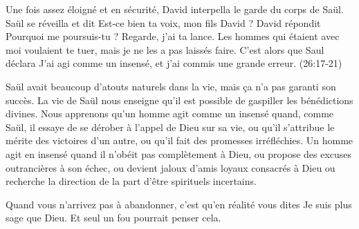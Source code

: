 Une fois assez éloigné et en sécurité, David interpella
 le garde du corps de Saül.
 Saül se réveilla et dit\frcolon
 \Og Est-ce bien ta voix, mon fils David ? \Fg{}
 David répondit\frcolon
 \Og Pourquoi me poursuis-tu ? Regarde, j'ai ta lance.
 Les hommes qui étaient avec moi voulaient te tuer,
 mais je ne les a pas laissés faire. \Fg{}
 C'est alors que Saul déclara\frcolon
 \Og J'ai agi comme un insensé, et j'ai commis une grande erreur. \Fg{}
 (26:17-21)

Saül avait beaucoup d'atouts naturels dans la vie,
 mais \c{c}a n'a pas garanti son succès.
 La vie de Saül nous enseigne qu'il est possible
 de gaspiller les bénédictions divines.
 Nous apprenons qu'un homme agit comme un insensé quand,
 comme Saül, il essaye de se dérober à l'appel de Dieu sur sa vie,
 ou qu'il s'attribue le mérite des victoires d'un autre,
 ou qu'il fait des promesses irréfléchies.
 Un homme agit en insensé quand il n'obéit pas complètement à Dieu,
 ou propose des excuses outrancières à son échec,
 ou devient jaloux d'amis loyaux consacrés à Dieu
 ou recherche la direction de la part d'être spirituels incertains.


Quand vous n'arrivez pas à abandonner, c'est qu'en réalité vous dites\frcolon
 \Og Je suis plus sage que Dieu. \Fg{}
 Et seul un fou pourrait penser cela. 

\dvrule






